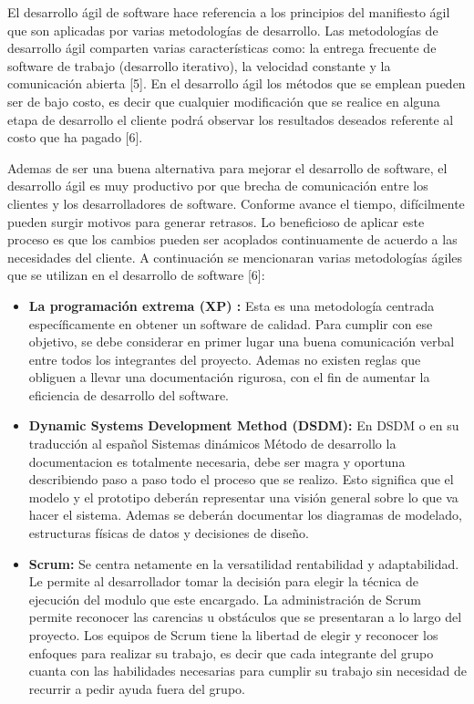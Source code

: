 El desarrollo ágil de software hace referencia a los principios del manifiesto ágil que son aplicadas por varias metodologías de desarrollo. Las metodologías de desarrollo ágil comparten varias características como: la entrega frecuente de software de trabajo (desarrollo iterativo), la velocidad constante y la comunicación abierta [5]. En el desarrollo ágil los métodos que se emplean pueden ser de bajo costo, es decir que cualquier modificación que se realice en alguna etapa de desarrollo el cliente podrá observar los resultados deseados referente al costo que ha pagado [6]. 

Ademas de ser una buena alternativa para mejorar el desarrollo de software, el desarrollo ágil es muy productivo por que brecha de comunicación entre los clientes y los desarrolladores de software. Conforme avance el tiempo, difícilmente pueden surgir motivos para generar retrasos. Lo beneficioso de aplicar este proceso es que los cambios pueden ser acoplados continuamente de acuerdo a las necesidades del cliente. A continuación se mencionaran varias metodologías ágiles que se utilizan en el desarrollo de software [6]:

\begin{itemize}
	\item \textbf{La programación extrema (XP) :} Esta es una metodología centrada específicamente en obtener un software de calidad. Para cumplir con ese objetivo, se debe considerar en primer lugar una buena comunicación verbal entre todos los integrantes del proyecto. Ademas no existen reglas que obliguen a llevar una documentación rigurosa, con el fin de aumentar la eficiencia de desarrollo del software.
	
	\item \textbf{Dynamic Systems Development Method (DSDM): }En DSDM o en su traducción al español Sistemas dinámicos Método de desarrollo la documentacion es totalmente necesaria, debe ser magra y oportuna describiendo paso a paso todo el proceso que se realizo. Esto significa que el modelo y el prototipo deberán representar una visión general sobre lo que va hacer el sistema. Ademas se deberán documentar los diagramas de modelado, estructuras físicas de datos y decisiones de diseño.
	
	\item \textbf{Scrum: } Se centra netamente en la versatilidad rentabilidad y adaptabilidad. Le permite al desarrollador tomar la decisión para elegir la técnica de ejecución del modulo que este encargado. La administración de Scrum permite reconocer las carencias u obstáculos que se presentaran a lo largo del proyecto. Los equipos de Scrum tiene la libertad de elegir y reconocer los enfoques para realizar su trabajo, es decir que cada integrante del grupo cuanta con las habilidades necesarias para cumplir su trabajo sin necesidad de recurrir a pedir ayuda fuera del grupo.
\end{itemize}



